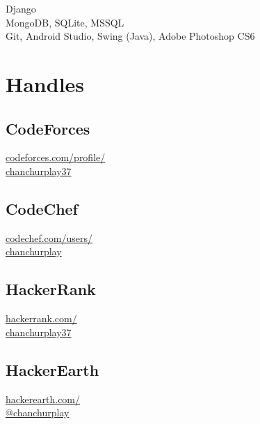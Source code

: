 \documentclass[]{hieudo-build}
\begin{document}
\begin{minipage}[t]{0.3\textwidth}
Django \\

MongoDB, SQLite, MSSQL \\

Git, Android Studio, Swing (Java), Adobe Photoshop CS6 \\ 

\sectionsep



\section{Handles}
\subsection{CodeForces}
	\href{http://codeforces.com/profile/chanchurplay37}{codeforces.com/profile/\\chanchurplay37}\\
\subsection{CodeChef} \href{https://www.codechef.com/users/chanchurplay}{codechef.com/users/\\chanchurplay} \\
\subsection{HackerRank} \href{https://www.hackerrank.com/chanchurplay37}{hackerrank.com/\\chanchurplay37} \\
\subsection{HackerEarth} \href{https://www.hackerearth.com/@chanchurplay}{hackerearth.com/\\@chanchurplay} \\


\end{minipage}
\end{document}
